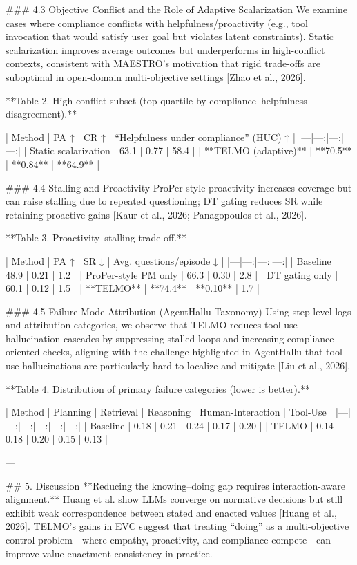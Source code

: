 ### 4.3 Objective Conflict and the Role of Adaptive Scalarization  
We examine cases where compliance conflicts with helpfulness/proactivity (e.g., tool invocation that would satisfy user goal but violates latent constraints). Static scalarization improves average outcomes but underperforms in high-conflict contexts, consistent with MAESTRO’s motivation that rigid trade-offs are suboptimal in open-domain multi-objective settings [Zhao et al., 2026].

**Table 2. High-conflict subset (top quartile by compliance–helpfulness disagreement).**

| Method | PA ↑ | CR ↑ | “Helpfulness under compliance” (HUC) ↑ |
|---|---:|---:|---:|
| Static scalarization | 63.1 | 0.77 | 58.4 |
| **TELMO (adaptive)** | **70.5** | **0.84** | **64.9** |

### 4.4 Stalling and Proactivity  
ProPer-style proactivity increases coverage but can raise stalling due to repeated questioning; DT gating reduces SR while retaining proactive gains [Kaur et al., 2026; Panagopoulos et al., 2026].

**Table 3. Proactivity–stalling trade-off.**

| Method | PA ↑ | SR ↓ | Avg. questions/episode ↓ |
|---|---:|---:|---:|
| Baseline | 48.9 | 0.21 | 1.2 |
| ProPer-style PM only | 66.3 | 0.30 | 2.8 |
| DT gating only | 60.1 | 0.12 | 1.5 |
| **TELMO** | **74.4** | **0.10** | 1.7 |

### 4.5 Failure Mode Attribution (AgentHallu Taxonomy)  
Using step-level logs and attribution categories, we observe that TELMO reduces tool-use hallucination cascades by suppressing stalled loops and increasing compliance-oriented checks, aligning with the challenge highlighted in AgentHallu that tool-use hallucinations are particularly hard to localize and mitigate [Liu et al., 2026].

**Table 4. Distribution of primary failure categories (lower is better).**

| Method | Planning | Retrieval | Reasoning | Human-Interaction | Tool-Use |
|---|---:|---:|---:|---:|---:|
| Baseline | 0.18 | 0.21 | 0.24 | 0.17 | 0.20 |
| TELMO | 0.14 | 0.18 | 0.20 | 0.15 | 0.13 |

---

## 5. Discussion  
**Reducing the knowing–doing gap requires interaction-aware alignment.** Huang et al. show LLMs converge on normative decisions but still exhibit weak correspondence between stated and enacted values [Huang et al., 2026]. TELMO’s gains in EVC suggest that treating “doing” as a multi-objective control problem—where empathy, proactivity, and compliance compete—can improve value enactment consistency in practice.

